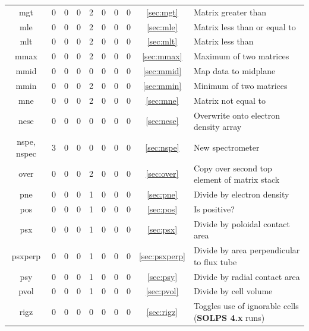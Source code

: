 \documentclass[a4paper,10pt]{report}
\newcommand\SOLPSfour{{\bf SOLPS 4.x} }
\begin{document}
\begin{center}
\begin{longtable}{|c|c|c|c|c|c|c|c|c|l|}
    mgt \index{b2plot, mgt}        & 0 & 0 & 0 & 2 & 0 & 0 & 0 & \ref{sec:mgt}   & Matrix greater than \\
    mle \index{b2plot, mle}        & 0 & 0 & 0 & 2 & 0 & 0 & 0 & \ref{sec:mle}   & Matrix less than or equal to \\
    mlt \index{b2plot, mlt}        & 0 & 0 & 0 & 2 & 0 & 0 & 0 & \ref{sec:mlt}   & Matrix less than \\
    mmax \index{b2plot, mmax}      & 0 & 0 & 0 & 2 & 0 & 0 & 0 & \ref{sec:mmax}  & Maximum of two matrices \\
    mmid \index{b2plot, mmid}      & 0 & 0 & 0 & 0 & 0 & 0 & 0 & \ref{sec:mmid}  & Map data to midplane \\
    mmin \index{b2plot, mmin}      & 0 & 0 & 0 & 2 & 0 & 0 & 0 & \ref{sec:mmin}  & Minimum of two matrices \\
    mne \index{b2plot, mne}        & 0 & 0 & 0 & 2 & 0 & 0 & 0 & \ref{sec:mne}   & Matrix not equal to \\
    nese \index{b2plot, nese}      & 0 & 0 & 0 & 0 & 0 & 0 & 0 & \ref{sec:nese}  & Overwrite onto electron density array \\
    nspe, nspec \index{b2plot, nspe}\index{b2plot, nspec} & 3 & 0 & 0 & 0 & 0 & 0 & 0 & \ref{sec:nspe}  & New spectrometer \\
    over \index{b2plot, over}      & 0 & 0 & 0 & 2 & 0 & 0 & 0 & \ref{sec:over}  & Copy over second top element of matrix stack \\
    pne \index{b2plot, pne}        & 0 & 0 & 0 & 1 & 0 & 0 & 0 & \ref{sec:pne}   & Divide by electron density \\
    pos \index{b2plot, pos}        & 0 & 0 & 0 & 1 & 0 & 0 & 0 & \ref{sec:pos}   & Is positive? \\
    psx \index{b2plot, psx}        & 0 & 0 & 0 & 1 & 0 & 0 & 0 & \ref{sec:psx}   & Divide by poloidal contact area \\
    psxperp \index{b2plot, psxperp} & 0 & 0 & 0 & 1 & 0 & 0 & 0 & \ref{sec:psxperp}   & Divide by area perpendicular to flux tube\\
    psy \index{b2plot, psy}        & 0 & 0 & 0 & 1 & 0 & 0 & 0 & \ref{sec:psy}   & Divide by radial contact area \\
    pvol \index{b2plot, pvol}      & 0 & 0 & 0 & 1 & 0 & 0 & 0 & \ref{sec:pvol}  & Divide by cell volume \\
    rigz \index{b2plot, rigz}      & 0 & 0 & 0 & 0 & 0 & 0 & 0 & \ref{sec:rigz}  & Toggles use of ignorable cells (\SOLPSfour runs) \\

\end{longtable}
\end{center}
\end{document}
